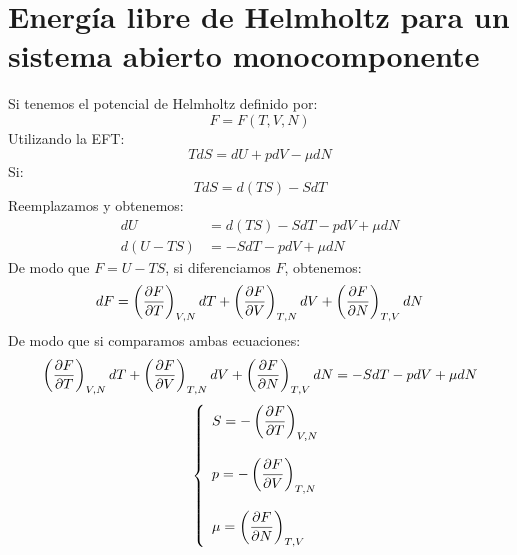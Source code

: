 \documentclass[../main]{subfiles}
\begin{document}
\section{Energía libre de Helmholtz para un sistema abierto monocomponente}
Si tenemos el potencial de Helmholtz definido por:
\begin{equation}
    F=F(T,V,N)
\end{equation}
Utilizando la EFT:
\begin{equation}
    TdS=dU+pdV-\mu dN
\end{equation}
Si:
\begin{equation*}
    TdS=d(TS)-SdT
\end{equation*}
Reemplazamos y obtenemos:
\begin{align}
    dU&=d(TS)-SdT-pdV+\mu dN \\
    d(U-TS)&=-SdT-pdV+\mu dN
\end{align}
De modo que $F=U-TS$, si diferenciamos $F$, obtenemos:
\begin{equation}
    dF=\left( \pdv{F}{T}\right)_{V,N}dT+\left( \pdv{F}{V} \right)_{T,N}dV+\left( \pdv{F}{N}\right)_{T,V}dN
\end{equation}
De modo que si comparamos ambas ecuaciones:
\begin{equation}
    \left( \pdv{F}{T}\right)_{V,N}dT+\left( \pdv{F}{V} \right)_{T,N}dV+\left( \pdv{F}{N}\right)_{T,V}dN=-SdT-pdV+\mu dN
\end{equation}
\begin{equation}
    \left\{ 
    \begin{array}{l}
         S=\displaystyle -\left( \pdv{F}{T}\right)_{V,N} \\ \\
         p=\displaystyle -\left( \pdv{F}{V} \right)_{T,N} \\ \\
         \mu=\displaystyle \left( \pdv{F}{N}\right)_{T,V}
    \end{array} 
    \right. 
\end{equation}
\end{document}
